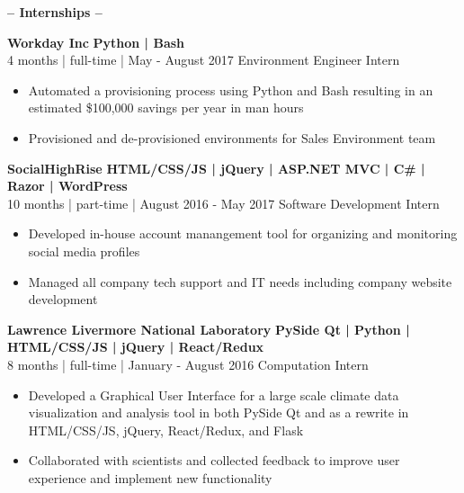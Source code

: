 \documentclass[12pt]{article}
\begin{document}
    \begin{center}
    \textbf{\Large-- Internships --}\\
    \end{center}
    \vspace{-5mm}

    \begin{footnotesize}
    \flushleft
    \textbf{\color{primary}\large Workday Inc} \hfill \textbf{\color{Cerulean}Python | Bash}\\ 
    {\color{primary}4 months | full-time | May - August 2017} \hfill {\color{Cerulean} Environment Engineer Intern}
    \vspace{-2mm}
    \begin{itemize}
        \setlength{\itemsep}{0pt}
        \item Automated a provisioning process using Python and Bash resulting in an estimated \$100,000 savings per year in man hours
        \item Provisioned and de-provisioned environments for Sales Environment team
    \end{itemize}
    \textbf{\color{primary}\large SocialHighRise} \hfill  \textbf{\color{Cerulean}HTML/CSS/JS | jQuery | ASP.NET MVC | C\# | Razor | WordPress } \\ 
    {\color{primary}10 months | part-time | August 2016 - May 2017} \hfill {\color{Cerulean} Software Development Intern}
    \vspace{-2mm}
    \begin{itemize}
        \setlength{\itemsep}{0pt}
        \item Developed in-house account manangement tool for organizing and monitoring social media profiles
        \item Managed all company tech support and IT needs including company website development
    \end{itemize}
    \textbf{\color{primary}\large Lawrence Livermore National Laboratory} \hfill \textbf{\color{Cerulean}PySide Qt | Python | HTML/CSS/JS | jQuery | React/Redux}\\
    {\color{primary}8 months | full-time | January - August 2016} \hfill {\color{Cerulean} Computation Intern}
    \vspace{-2mm}
    \begin{itemize}
        \setlength{\itemsep}{0pt}
        \item Developed a Graphical User Interface for a large scale climate data visualization and analysis tool in both PySide Qt and as a rewrite in HTML/CSS/JS, jQuery, React/Redux, and Flask

        \item Collaborated with scientists and collected feedback to improve user experience and implement new functionality
    \end{itemize}

    \end{footnotesize}
    
\end{document}
